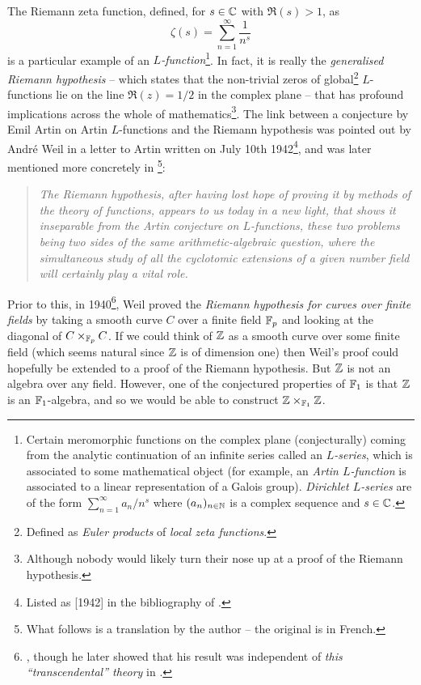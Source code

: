     The Riemann zeta function, defined, for $s\in\mathbb{C}$ with $\Re(s)>1$, as
    \begin{equation*}
        \zeta(s) = \sum_{n=1}^\infty\frac1{n^s}
    \end{equation*}
    is a particular example of an \emph{$L$-function}\footnote{
        Certain meromorphic functions on the complex plane (conjecturally) coming from the analytic continuation of an infinite series called an \emph{$L$-series}, which is associated to some mathematical object (for example, an \emph{Artin $L$-function} is associated to a linear representation of a Galois group).
        \emph{Dirichlet $L$-series} are of the form $\sum_{n=1}^\infty a_n/n^s$ where $(a_n)_{n\in\mathbb{N}}$ is a complex sequence and $s\in\mathbb{C}$.
    }.
    In fact, it is really the \emph{generalised Riemann hypothesis} -- which states that the non-trivial zeros of global\footnote{
        Defined as \emph{Euler products} of \emph{local zeta functions}.
    } $L$-functions lie on the line $\Re(z)=1/2$ in the complex plane -- that has profound implications across the whole of mathematics\footnote{
        Although nobody would likely turn their nose up at a proof of the Riemann hypothesis.
    }.
    The link between a conjecture by Emil Artin on Artin $L$-functions \cite{Artin:1923hi} and the Riemann hypothesis was pointed out by André Weil in a letter to Artin written on July 10th 1942\footnote{
        Listed as [1942] in the bibliography of \cite{Weil:2009vp}.
    }, and was later mentioned more concretely in \cite[4]{Weil:1947wd}\footnote{
        What follows is a translation by the author -- the original is in French.
    }:
    \begin{quotation}
        \emph{The Riemann hypothesis, after having lost hope of proving it by methods of the theory of functions, appears to us today in a new light, that shows it inseparable from the Artin conjecture on $L$-functions, these two problems being two sides of the same arithmetic-algebraic question, where the simultaneous study of all the cyclotomic extensions of a given number field will certainly play a vital role.}
    \end{quotation}
    Prior to this, in 1940\footnote{
        \cite{Weil:1940ub}, though he later showed that his result was independent of \emph{this ``transcendental'' theory} in \cite{Weil:1941tx}.
    }, Weil proved the \emph{Riemann hypothesis for curves over finite fields} by taking a smooth curve $C$ over a finite field $\mathbb{F}_p$ and looking at the diagonal of $C\times_{\mathbb{F}_p}C$.
    If we could think of $\mathbb{Z}$ as a smooth curve over some finite field (which seems natural since $\mathbb{Z}$ is of dimension one) then Weil's proof could hopefully be extended to a proof of the Riemann hypothesis.
    But $\mathbb{Z}$ is not an algebra over any field.
    However, one of the conjectured properties of $\mathbb{F}_1$ is that $\mathbb{Z}$ is an $\mathbb{F}_1$-algebra, and so we would be able to construct $\mathbb{Z}\times_{\mathbb{F}_1}\mathbb{Z}$.

